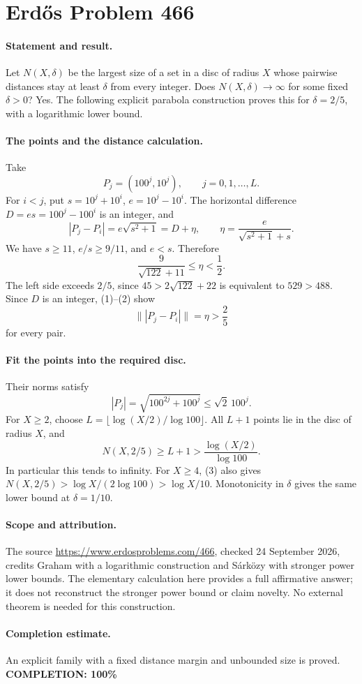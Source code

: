 \section*{Erd\H{o}s Problem 466}

\paragraph{Statement and result.}
Let \(N(X,\delta)\) be the largest size of a set in a disc of radius
\(X\) whose pairwise distances stay at least \(\delta\) from every
integer. Does \(N(X,\delta)\to\infty\) for some fixed \(\delta>0\)?
Yes. The following explicit parabola construction proves this for
\(\delta=2/5\), with a logarithmic lower bound.

\paragraph{The points and the distance calculation.}
Take
\[
 P_j=(100^j,10^j),\qquad j=0,1,\ldots,L.
\]
For \(i<j\), put \(s=10^j+10^i\), \(e=10^j-10^i\).
The horizontal difference \(D=es=100^j-100^i\) is an integer, and
\[
 |P_j-P_i|=e\sqrt{s^2+1}=D+\eta,\qquad
 \eta=\frac{e}{\sqrt{s^2+1}+s}.
 \tag{1}
\]
We have \(s\geq11\), \(e/s\geq9/11\), and \(e<s\). Therefore
\[
 \frac{9}{\sqrt{122}+11}
 \leq\eta<\frac12.
 \tag{2}
\]
The left side exceeds \(2/5\), since
\(45>2\sqrt{122}+22\) is equivalent to \(529>488\).
Since \(D\) is an integer, (1)--(2) show
\[
 \bigl\||P_j-P_i|\bigr\|=\eta>\frac25
\]
for every pair.

\paragraph{Fit the points into the required disc.}
Their norms satisfy
\[
 |P_j|=\sqrt{100^{2j}+100^j}\leq\sqrt2\,100^j.
\]
For \(X\geq2\), choose
\(L=\lfloor\log(X/2)/\log100\rfloor\).
All \(L+1\) points lie in the disc of radius \(X\), and
\[
 N(X,2/5)\geq L+1>
 \frac{\log(X/2)}{\log100}.
 \tag{3}
\]
In particular this tends to infinity. For \(X\geq4\), (3) also gives
\(N(X,2/5)>\log X/(2\log100)>\log X/10\).
Monotonicity in \(\delta\) gives the same lower bound at \(\delta=1/10\).

\paragraph{Scope and attribution.}
The source \url{https://www.erdosproblems.com/466},
checked 24 September 2026, credits Graham with a logarithmic construction
and S\'ark\"ozy with stronger power lower bounds.
The elementary calculation here provides a full affirmative answer;
it does not reconstruct the stronger power bound or claim novelty.
No external theorem is needed for this construction.

\paragraph{Completion estimate.}
An explicit family with a fixed distance margin and unbounded size is proved.
\textbf{COMPLETION: 100\%}
